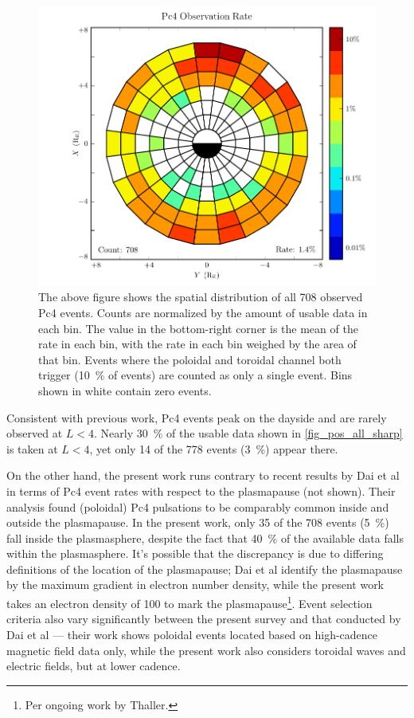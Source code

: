 \begin{figure}[!htb]
  \centering
  \includegraphics[width=\textwidth]{figures/rate_all_sharp.pdf}
  \caption[Rate of Pc4 Events]{
    The above figure shows the spatial distribution of all 708 observed Pc4
    events. Counts are normalized by the amount of usable data in each bin. The
    value in the bottom-right corner is the mean of the rate in each bin, with
    the rate in each bin weighed by the area of that bin. Events where the
    poloidal and toroidal channel both trigger (\about\SI{10}{\percent} of
    events) are counted as only a single event. Bins shown in white contain
    zero events. 
  }
  \label{fig_rate_all_sharp}
\end{figure}

Consistent with previous
work\cite{anderson_1990,dai_2015,kokubun_1989,liu_2009}, Pc4 events peak on the
dayside and are rarely
observed at $L < 4$. Nearly \SI{30}{\percent} of the usable data shown in
\cref{fig_pos_all_sharp} is taken at $L < 4$, yet only 14 of the 778 events
(\SI{3}{\percent}) appear there. 

On the other hand, the present work runs contrary to recent results by Dai et
al in terms
of Pc4 event rates with respect to the plasmapause (not shown). Their analysis
found (poloidal) Pc4 pulsations to be comparably common inside and outside the
plasmapause\cite{dai_2015}. In the present work, only 35 of the 708 events
(\SI{5}{\percent}) fall inside the plasmasphere, despite the fact that
\SI{40}{\percent} of the available data falls within the plasmasphere. 
It's possible that the discrepancy is due to differing definitions of the
location of the plasmapause; Dai et al
identify the plasmapause by the maximum gradient in electron number density,
while the present work takes an electron density of \SI{100}{\percc} to mark
the plasmapause\footnote{Per ongoing work by Thaller. }. Event selection
criteria also vary significantly between the present survey and that conducted
by Dai et al --- their work shows poloidal events located based on high-cadence
magnetic field data only, while the present work also considers toroidal waves
and electric fields, but at lower cadence. 

